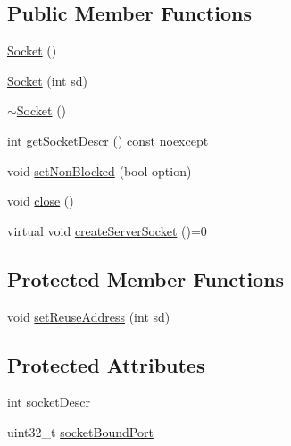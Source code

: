 \subsection*{Public Member Functions}
\begin{DoxyCompactItemize}
\item 
\hyperlink{class_socket_a7c3256c4fc6e2c603df73201049fae5a}{Socket} ()
\item 
\hyperlink{class_socket_aaba0adce0be29d723470f6e80d65b67e}{Socket} (int sd)
\item 
\hyperlink{class_socket_aeac4eb6379a543d38ed88977d3b6630a}{$\sim$\-Socket} ()
\item 
int \hyperlink{class_socket_ae10384da04283e2a75b4cfbb8c6da59a}{get\-Socket\-Descr} () const noexcept
\item 
void \hyperlink{class_socket_aa264f52f830e5c1bea3cd92732df35f8}{set\-Non\-Blocked} (bool option)
\item 
void \hyperlink{class_socket_a75ee749264ccbcfc4dfbf5442e55dcb8}{close} ()
\item 
virtual void \hyperlink{class_socket_a3376aae78f0c696c3787e4f04ed7f680}{create\-Server\-Socket} ()=0
\end{DoxyCompactItemize}
\subsection*{Protected Member Functions}
\begin{DoxyCompactItemize}
\item 
void \hyperlink{class_socket_a51eb429ad7f6f6ab1adafe64d302ed55}{set\-Reuse\-Address} (int sd)
\end{DoxyCompactItemize}
\subsection*{Protected Attributes}
\begin{DoxyCompactItemize}
\item 
int \hyperlink{class_socket_a610fbf456550dd084cfaee9d1267e5c8}{socket\-Descr}
\item 
uint32\-\_\-t \hyperlink{class_socket_ab05ebf38966e1cd1f093819a6bdad5b1}{socket\-Bound\-Port}
\end{DoxyCompactItemize}


